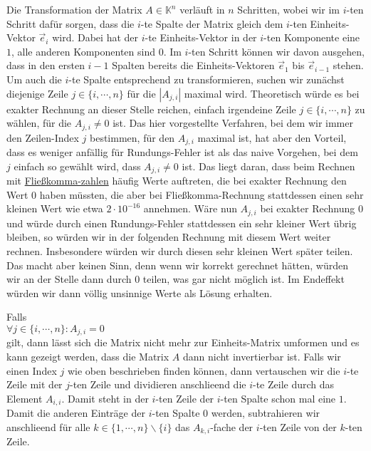 Die Transformation der Matrix $A \in \mathbb{K}^n$ verl\"{a}uft in $n$ Schritten, wobei wir im $i$-ten
Schritt daf\"{u}r sorgen, dass die $i$-te Spalte der Matrix gleich dem $i$-ten Einheits-Vektor
$\vec{e}_i$ wird.  Dabei hat der $i$-te Einheits-Vektor in der $i$-ten Komponente eine $1$, alle
anderen Komponenten sind $0$.  Im $i$-ten Schritt k\"{o}nnen wir davon ausgehen, dass in den ersten $i-1$
Spalten bereits die Einheits-Vektoren $\vec{e}_1$ bis $\vec{e}_{i-1}$ stehen.
Um auch die $i$-te Spalte entsprechend zu transformieren, suchen wir zun\"{a}chst diejenige Zeile 
$j \in \{i, \cdots, n\}$ f\"{u}r die $|A_{j,i}|$ maximal wird.  Theoretisch w\"{u}rde es bei exakter Rechnung an dieser Stelle
reichen, einfach irgendeine Zeile $j \in \{i, \cdots, n\}$ zu w\"{a}hlen, f\"{u}r die $A_{j,i} \not= 0$ 
ist.  Das hier vorgestellte Verfahren, bei dem wir immer den Zeilen-Index $j$ bestimmen, f\"{u}r den
$A_{j,i}$ maximal ist, hat aber den Vorteil, dass es weniger anf\"{a}llig f\"{u}r Rundungs-Fehler ist als
das naive Vorgehen, bei dem $j$ einfach so gew\"{a}hlt wird, dass $A_{j,i} \not= 0$ ist.  Das liegt daran, dass
beim Rechnen mit \href{https://de.wikipedia.org/wiki/Gleitkommazahl}{Flie{\ss}komma-zahlen} h\"aufig Werte
auftreten, die bei exakter Rechnung den Wert $0$ haben 
m\"ussten, die aber bei Flie{\ss}komma-Rechnung stattdessen einen sehr kleinen Wert wie etwa 
$2 \cdot 10^{-16}$ annehmen.  W\"are nun $A_{j,i}$ bei exakter Rechnung $0$ und w\"urde durch einen
Rundungs-Fehler stattdessen ein sehr kleiner Wert \"ubrig bleiben, so w\"urden wir in der folgenden Rechnung
mit diesem Wert weiter rechnen.  Insbesondere w\"urden wir durch diesen sehr kleinen Wert sp\"ater teilen.
Das macht aber keinen Sinn, denn wenn wir korrekt gerechnet h\"atten, w\"urden wir an der Stelle dann durch $0$ teilen, was
gar nicht m\"oglich ist.  Im Endeffekt w\"urden wir dann v\"ollig unsinnige Werte als L\"osung erhalten.

Falls 
\\[0.2cm]
\hspace*{1.3cm}
$\forall j \in \{i, \cdots, n\} : A_{j,i} = 0$ 
\\[0.2cm]
gilt, dann l\"{a}sst sich die Matrix nicht mehr zur Einheits-Matrix umformen und es kann gezeigt werden,
dass die Matrix $A$ dann nicht invertierbar ist.  Falls wir einen Index $j$ wie oben beschrieben
finden k\"{o}nnen, dann vertauschen wir die $i$-te Zeile mit der $j$-ten Zeile und dividieren
anschlie\3end die $i$-te Zeile durch das Element $A_{i,i}$.  Damit steht in der $i$-ten Zeile der
$i$-ten Spalte schon mal eine $1$.  Damit die anderen Eintr\"{a}ge der $i$-ten Spalte $0$ werden,
subtrahieren wir anschlie\3end f\"{u}r alle $k \in \{ 1, \cdots, n \} \backslash \{i\}$ das $A_{k,i}$-fache der $i$-ten
Zeile von der $k$-ten Zeile.


